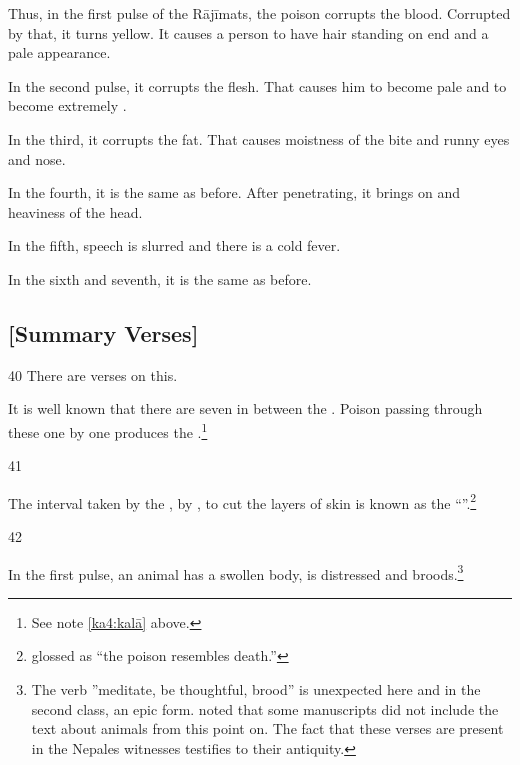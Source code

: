 \begin{translation}
Thus, in the first pulse of the Rājīmats, the poison corrupts the blood. 
Corrupted by that, it turns yellow.  It causes a person to have hair standing on 
end and a pale appearance. 

In the second pulse, it corrupts the flesh. That causes him to become pale and to 
become extremely .

In the third, it corrupts the fat.  That causes moistness of the bite and runny eyes 
and nose. 

In the fourth, it is the same as before.  After penetrating, it brings on 
 and heaviness of the head.

In the fifth, speech is slurred and there is a cold fever.

In the sixth and seventh, it is the same as before. 



\subsection{[Summary Verses]}

\item[40]
There are verses on this.

\begin{sloka}
It is well known that there are seven  in
between the .  Poison passing through these one
by one produces the .\footnote{See note \ref{ka4:kalā}
    above.}
\end{sloka}


\item[41]
\begin{sloka}
The interval taken by the ,  by , to cut the layers of 
    skin is
known as the “”.\footnote{ glossed  as
     “the poison resembles death.”}
\end{sloka}


\item[42]

\begin{sloka}
    In the first pulse, an animal has a swollen body, is distressed and
broods.\footnote{The verb \root{} ”meditate, be
    thoughtful, brood” is unexpected here and in the  second class, an
    epic form.  noted that some manuscripts did not
    include the text about animals from this point on.  The fact that
    these verses are present in the Nepales witnesses testifies to their
    antiquity.}
    

\end{sloka}
\end{translation}
